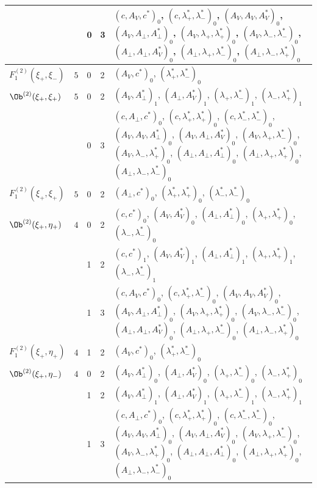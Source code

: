 {\begin{longtable}{>{\raggedright}p{2.3cm}|p{0.6cm}|p{0.25cm}|p{0.25cm}|>{\raggedright\arraybackslash}p{11.6cm}}
 &  & 0 & 3 & $(c,A_V,c^*)_{0}$, $(c,\lambda^*_+,\lambda^*_-)_{0}$, $(A_V,A_V,A^*_V)_{0}$, $(A_V,A_\perp,A^*_\perp)_{0}$, $(A_V,\lambda_+,\lambda^*_+)_{0}$, $(A_V,\lambda_-,\lambda^*_-)_{0}$, $(A_\perp,A_\perp,A^*_V)_{0}$, $(A_\perp,\lambda_+,\lambda^*_-)_{0}$, $(A_\perp,\lambda_-,\lambda^*_+)_{0}$ \\
\hline
$F_1^{(2)}(\xi_+,\xi_-)$ & $5$ & 0 & 2 & $(A_V,c^*)_{0}$, $(\lambda^*_+,\lambda^*_-)_{0}$ \\
\hline
$\Ob^{(2)}(\xi_+,\xi_+)$ & $5$ & 0 & 2 & $(A_V,A^*_\perp)_{1}$, $(A_\perp,A^*_V)_{1}$, $(\lambda_+,\lambda^*_-)_{1}$, $(\lambda_-,\lambda^*_+)_{1}$ \\
 &  & 0 & 3 & $(c,A_\perp,c^*)_{0}$, $(c,\lambda^*_+,\lambda^*_+)_{0}$, $(c,\lambda^*_-,\lambda^*_-)_{0}$, $(A_V,A_V,A^*_\perp)_{0}$, $(A_V,A_\perp,A^*_V)_{0}$, $(A_V,\lambda_+,\lambda^*_-)_{0}$, $(A_V,\lambda_-,\lambda^*_+)_{0}$, $(A_\perp,A_\perp,A^*_\perp)_{0}$, $(A_\perp,\lambda_+,\lambda^*_+)_{0}$, $(A_\perp,\lambda_-,\lambda^*_-)_{0}$ \\
\hline
$F_1^{(2)}(\xi_+,\xi_+)$ & $5$ & 0 & 2 & $(A_\perp,c^*)_{0}$, $(\lambda^*_+,\lambda^*_+)_{0}$, $(\lambda^*_-,\lambda^*_-)_{0}$ \\
\hline
$\Ob^{(2)}(\xi_+,\eta_+)$ & $4$ & 0 & 2 & $(c,c^*)_{0}$, $(A_V,A^*_V)_{0}$, $(A_\perp,A^*_\perp)_{0}$, $(\lambda_+,\lambda^*_+)_{0}$, $(\lambda_-,\lambda^*_-)_{0}$ \\
 &  & 1 & 2 & $(c,c^*)_{1}$, $(A_V,A^*_V)_{1}$, $(A_\perp,A^*_\perp)_{1}$, $(\lambda_+,\lambda^*_+)_{1}$, $(\lambda_-,\lambda^*_-)_{1}$ \\
 &  & 1 & 3 & $(c,A_V,c^*)_{0}$, $(c,\lambda^*_+,\lambda^*_-)_{0}$, $(A_V,A_V,A^*_V)_{0}$, $(A_V,A_\perp,A^*_\perp)_{0}$, $(A_V,\lambda_+,\lambda^*_+)_{0}$, $(A_V,\lambda_-,\lambda^*_-)_{0}$, $(A_\perp,A_\perp,A^*_V)_{0}$, $(A_\perp,\lambda_+,\lambda^*_-)_{0}$, $(A_\perp,\lambda_-,\lambda^*_+)_{0}$ \\
\hline
$F_1^{(2)}(\xi_+,\eta_+)$ & $4$ & 1 & 2 & $(A_V,c^*)_{0}$, $(\lambda^*_+,\lambda^*_-)_{0}$ \\
\hline
$\Ob^{(2)}(\xi_+,\eta_-)$ & $4$ & 0 & 2 & $(A_V,A^*_\perp)_{0}$, $(A_\perp,A^*_V)_{0}$, $(\lambda_+,\lambda^*_-)_{0}$, $(\lambda_-,\lambda^*_+)_{0}$ \\
 &  & 1 & 2 & $(A_V,A^*_\perp)_{1}$, $(A_\perp,A^*_V)_{1}$, $(\lambda_+,\lambda^*_-)_{1}$, $(\lambda_-,\lambda^*_+)_{1}$ \\
 &  & 1 & 3 & $(c,A_\perp,c^*)_{0}$, $(c,\lambda^*_+,\lambda^*_+)_{0}$, $(c,\lambda^*_-,\lambda^*_-)_{0}$, $(A_V,A_V,A^*_\perp)_{0}$, $(A_V,A_\perp,A^*_V)_{0}$, $(A_V,\lambda_+,\lambda^*_-)_{0}$, $(A_V,\lambda_-,\lambda^*_+)_{0}$, $(A_\perp,A_\perp,A^*_\perp)_{0}$, $(A_\perp,\lambda_+,\lambda^*_+)_{0}$, $(A_\perp,\lambda_-,\lambda^*_-)_{0}$ \\

\end{longtable}}
